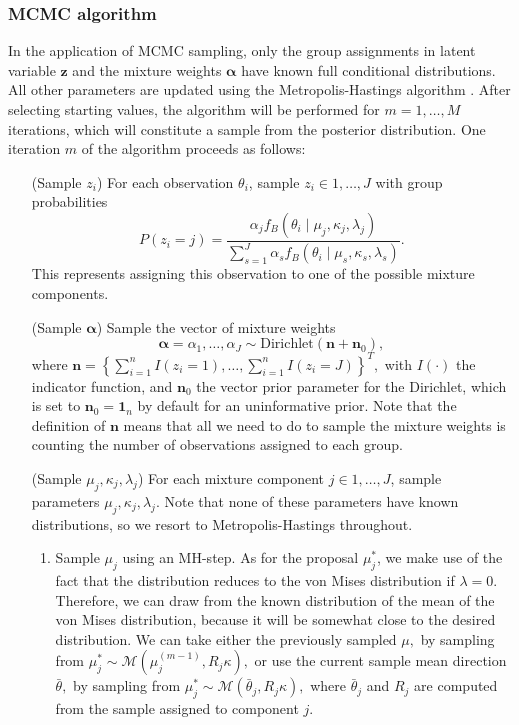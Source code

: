 \subsubsection{MCMC algorithm}
\label{subsub:mcmc}

In the application of MCMC sampling, only the group assignments in latent variable \(\boldsymbol{z}\) and the mixture weights \(\boldsymbol\alpha\) have known full conditional distributions. All other parameters are updated using the Metropolis-Hastings algorithm \citep{metropolis1953equation, hastings1970monte}. After selecting starting values, the algorithm will be performed for \(m = 1,\dots, M\) iterations, which will constitute a sample from the posterior distribution. One iteration \(m\) of the algorithm proceeds as follows:

\begin{enumerate}

\item[(Sample \(z_i\))]  For each observation $\theta_i$, sample $z_i\in 1, \dots, J$ with group probabilities $$P(z_i = j) = \frac{\alpha_j f_B(\theta_i \mid \mu_j, \kappa_j, \lambda_j)}{\sum_{s=1}^J \alpha_s f_B(\theta_i \mid \mu_s, \kappa_s, \lambda_s)}.$$ This represents assigning this observation to one of the possible mixture components.

\item[(Sample \(\boldsymbol{\alpha}\))] Sample the vector of mixture weights $$\boldsymbol{\alpha} = \alpha_1, \dots, \alpha_J \sim \text{Dirichlet}(\boldsymbol{n} + \boldsymbol{n}_0),$$ where \(\boldsymbol{n} = \left\{\sum_{i = 1}^n I(z_i = 1), \dots, \sum_{i = 1}^n I(z_i = J)\right\}^T,\) with $I(\cdot)$ the indicator function, and $\boldsymbol{n}_0$ the vector prior parameter for the Dirichlet, which is set to  $\boldsymbol{n}_0 = \boldsymbol{1}_n$ by default for an uninformative prior. Note that the definition of $\boldsymbol{n}$ means that all we need to do to sample the mixture weights is counting the number of observations assigned to each group.

\item[(Sample \(\mu_j, \kappa_j, \lambda_j\))] For each mixture component $j\in 1, \dots, J$, sample parameters $\mu_j, \kappa_j, \lambda_j.$ Note that none of these parameters have known distributions, so we resort to Metropolis-Hastings throughout.

\begin{enumerate}
    \item Sample $\mu_j$ using an MH-step. As for the proposal $\mu_j^\ast$, we make use of the fact that the distribution reduces to the von Mises distribution if $\lambda = 0$. Therefore, we can draw from the known distribution of the mean of the von Mises distribution, because it will be somewhat close to the desired distribution. We can take either the previously sampled $\mu,$ by sampling from $\mu_j^\ast \sim \mathcal{M}\left(\mu_j^{(m - 1)}, R_j \kappa\right),$ or use the current sample mean direction $\bar{\theta},$ by sampling from $\mu_j^\ast \sim \mathcal{M}\left(\bar{\theta}_j, R_j \kappa\right),$ where $\bar{\theta}_j$ and $R_j$ are computed from the sample assigned to component $j$.


\end{enumerate}
\end{enumerate}
